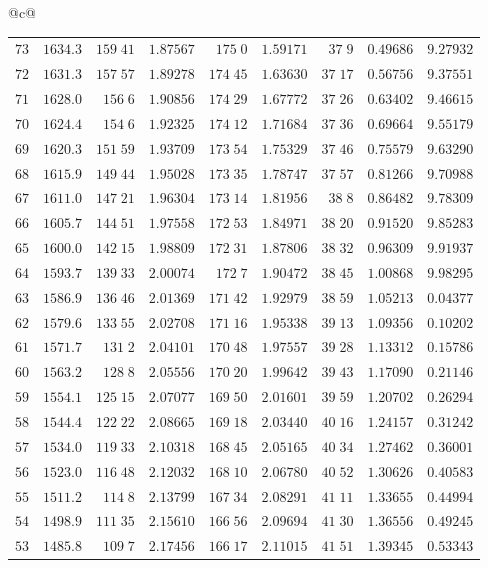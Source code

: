 \begin{center}
{\begin{tabular}{@{}c@{}}
\begin{tabular}{r|r|r|r|r|r|r|r|r}
$73$&$1634.3$&$159\;41$&$1.87567$&$175\;0$&$1.59171$&$37\;9$&$0.49686$&$9.27932$\\
$72$&$1631.3$&$157\;57$&$1.89278$&$174\;45$&$1.63630$&$37\;17$&$0.56756$&$9.37551$\\
$71$&$1628.0$&$156\;6$&$1.90856$&$174\;29$&$1.67772$&$37\;26$&$0.63402$&$9.46615$\\[2pt]
$70$&$1624.4$&$154\;6$&$1.92325$&$174\;12$&$1.71684$&$37\;36$&$0.69664$&$9.55179$\\
$69$&$1620.3$&$151\;59$&$1.93709$&$173\;54$&$1.75329$&$37\;46$&$0.75579$&$9.63290$\\
$68$&$1615.9$&$149\;44$&$1.95028$&$173\;35$&$1.78747$&$37\;57$&$0.81266$&$9.70988$\\
$67$&$1611.0$&$147\;21$&$1.96304$&$173\;14$&$1.81956$&$38\;8$&$0.86482$&$9.78309$\\
$66$&$1605.7$&$144\;51$&$1.97558$&$172\;53$&$1.84971$&$38\;20$&$0.91520$&$9.85283$\\[2pt]
$65$&$1600.0$&$142\;15$&$1.98809$&$172\;31$&$1.87806$&$38\;32$&$0.96309$&$9.91937$\\
$64$&$1593.7$&$139\;33$&$2.00074$&$172\;7$&$1.90472$&$38\;45$&$1.00868$&$9.98295$\\
$63$&$1586.9$&$136\;46$&$2.01369$&$171\;42$&$1.92979$&$38\;59$&$1.05213$&$0.04377$\\
$62$&$1579.6$&$133\;55$&$2.02708$&$171\;16$&$1.95338$&$39\;13$&$1.09356$&$0.10202$\\
$61$&$1571.7$&$131\;2$&$2.04101$&$170\;48$&$1.97557$&$39\;28$&$1.13312$&$0.15786$\\[2pt]
$60$&$1563.2$&$128\;8$&$2.05556$&$170\;20$&$1.99642$&$39\;43$&$1.17090$&$0.21146$\\
$59$&$1554.1$&$125\;15$&$2.07077$&$169\;50$&$2.01601$&$39\;59$&$1.20702$&$0.26294$\\
$58$&$1544.4$&$122\;22$&$2.08665$&$169\;18$&$2.03440$&$40\;16$&$1.24157$&$0.31242$\\
$57$&$1534.0$&$119\;33$&$2.10318$&$168\;45$&$2.05165$&$40\;34$&$1.27462$&$0.36001$\\
$56$&$1523.0$&$116\;48$&$2.12032$&$168\;10$&$2.06780$&$40\;52$&$1.30626$&$0.40583$\\[2pt]
$55$&$1511.2$&$114\;8$&$2.13799$&$167\;34$&$2.08291$&$41\;11$&$1.33655$&$0.44994$\\
$54$&$1498.9$&$111\;35$&$2.15610$&$166\;56$&$2.09694$&$41\;30$&$1.36556$&$0.49245$\\
$53$&$1485.8$&$109\;7$&$2.17456$&$166\;17$&$2.11015$&$41\;51$&$1.39345$&$0.53343$\\

\end{tabular}
\end{tabular}}
\end{center}
